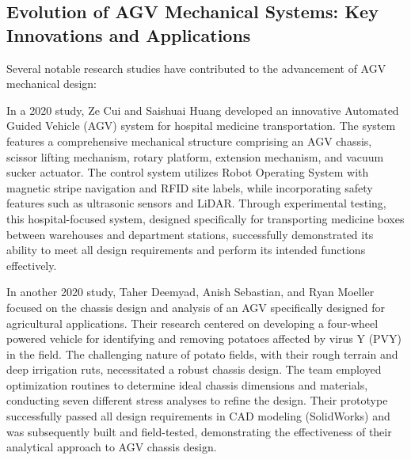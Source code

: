 \documentclass[../../main]{subfiles}
\begin{document}
\subsection[Evolution of AGV Mechanical Systems]{Evolution of AGV Mechanical Systems: Key Innovations and Applications}



Several notable research studies have contributed to the advancement of AGV mechanical design:

In a 2020 study, Ze Cui and Saishuai Huang developed an innovative Automated Guided Vehicle (AGV) system for hospital medicine transportation. The system features a comprehensive mechanical structure comprising an AGV chassis, scissor lifting mechanism, rotary platform, extension mechanism, and vacuum sucker actuator. The control system utilizes Robot Operating System with magnetic stripe navigation and RFID site labels, while incorporating safety features such as ultrasonic sensors and LiDAR. Through experimental testing, this hospital-focused system, designed specifically for transporting medicine boxes between warehouses and department stations, successfully demonstrated its ability to meet all design requirements and perform its intended functions effectively.

In another 2020 study, Taher Deemyad, Anish Sebastian, and Ryan Moeller focused on the chassis design and analysis of an AGV specifically designed for agricultural applications. Their research centered on developing a four-wheel powered vehicle for identifying and removing potatoes affected by virus Y (PVY) in the field. The challenging nature of potato fields, with their rough terrain and deep irrigation ruts, necessitated a robust chassis design. The team employed optimization routines to determine ideal chassis dimensions and materials, conducting seven different stress analyses to refine the design. Their prototype successfully passed all design requirements in CAD modeling (SolidWorks) and was subsequently built and field-tested, demonstrating the effectiveness of their analytical approach to AGV chassis design.
\end{document}
